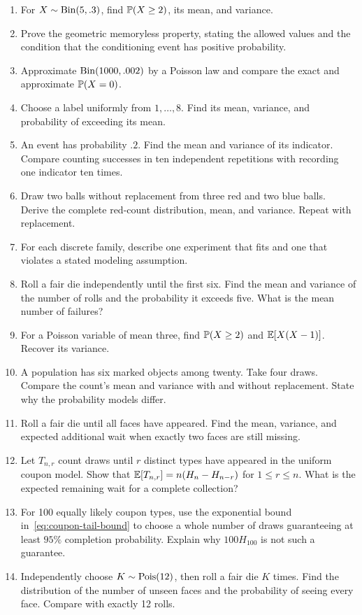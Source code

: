\begin{exercisebox}
\begin{enumerate}
 \item For $X\sim\Bin(5,.3)$, find $\P(X\ge2)$, its mean, and variance.
 \item Prove the geometric memoryless property, stating the allowed
 values and the condition that the conditioning event has positive
 probability. 
 \item Approximate $\Bin(1000,.002)$ by a Poisson law and compare
 the exact and approximate $\P(X=0)$. 
 \item Choose a label uniformly from $1,\ldots,8$. Find its mean,
 variance, and probability of exceeding its mean. 
 \item An event has probability $.2$. Find the mean and variance
 of its indicator. Compare counting successes in ten independent
 repetitions with recording one indicator ten times. 
 \item Draw two balls without replacement from three red and two blue
 balls. Derive the complete red-count distribution, mean, and variance.
 Repeat with replacement. 
 \item For each discrete family, describe one experiment that fits
 and one that violates a stated modeling assumption. 
 \item Roll a fair die independently until the first six. Find the
 mean and variance of the number of rolls and the probability it exceeds
 five. What is the mean number of failures? 
 \item For a Poisson variable of mean three, find $\P(X\ge2)$ and
 $\E[X(X-1)]$. Recover its variance. 
 \item A population has six marked objects among twenty. Take four
 draws. Compare the count's mean and variance with and without replacement.
 State why the probability models differ. 
 \item Roll a fair die until all faces have appeared. Find the mean,
 variance, and expected additional wait when exactly two faces are still
 missing. 
 \item Let $T_{n,r}$ count draws until $r$ distinct types have appeared
 in the uniform coupon model. Show that
 $\E[T_{n,r}]=n(H_n-H_{n-r})$ for $1\le r\le n$.
 What is the expected remaining wait for a complete collection?
 \item For 100 equally likely coupon types, use the exponential bound
 in~\eqref{eq:coupon-tail-bound} to choose a whole number of draws
 guaranteeing at least $95\%$ completion probability. Explain why
 $100H_{100}$ is not such a guarantee. 
 \item Independently choose $K\sim\Pois(12)$, then roll a fair die $K$ times.
 Find the distribution of the number of unseen faces and the probability
 of seeing every face. Compare with exactly 12 rolls. 
\end{enumerate}
\end{exercisebox}


